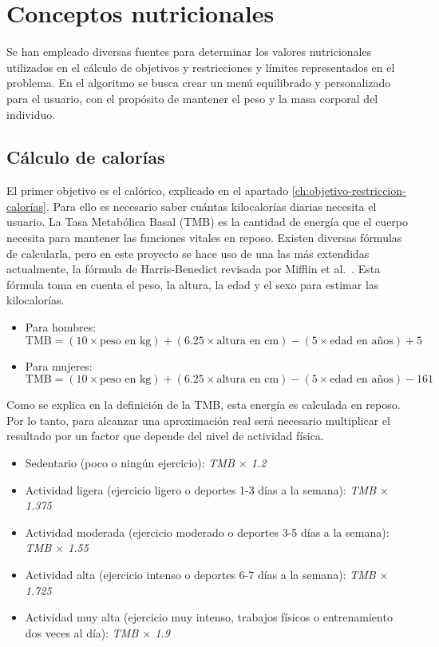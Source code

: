 \section{Conceptos nutricionales}

Se han empleado diversas fuentes para determinar los valores nutricionales utilizados en el cálculo de objetivos y restricciones y límites representados en el problema. En el algoritmo se busca crear un menú equilibrado y personalizado para el usuario, con el propósito de mantener el peso y la masa corporal del individuo.

\subsection{Cálculo de calorías}
\label{ch:calculo-calorías}

El primer objetivo es el calórico, explicado en el apartado \ref{ch:objetivo-restriccion-calorías}. Para ello es necesario saber cuántas kilocalorías diarias necesita el usuario. La Tasa Metabólica Basal (TMB) es la cantidad de energía que el cuerpo necesita para mantener las funciones vitales en reposo. Existen diversas fórmulas de calcularla, pero en este proyecto se hace uso de una las más extendidas actualmente, la fórmula de Harris-Benedict revisada por Mifflin et al.~\cite{mifflin1990}. Esta fórmula toma en cuenta el peso, la altura, la edad y el sexo para estimar las kilocalorías.
\begin{itemize}
    \item Para hombres:
    \[\text{TMB} = (10 \times \text{peso en kg}) + (6.25 \times \text{altura en cm}) - (5 \times \text{edad en años}) + 5\]
    \item Para mujeres:
    \[\text{TMB} = (10 \times \text{peso en kg}) + (6.25 \times \text{altura en cm}) - (5 \times \text{edad en años}) - 161\]
\end{itemize}
Como se explica en la definición de la TMB, esta energía es calculada en reposo. Por lo tanto, para alcanzar una aproximación real será necesario multiplicar el resultado por un factor que depende del nivel de actividad física.~\cite{krause2016}

\begin{itemize}
    \item Sedentario (poco o ningún ejercicio): \textit{TMB $\times$ 1.2}
    \item Actividad ligera (ejercicio ligero o deportes 1-3 días a la semana): \textit{TMB $\times$ 1.375}
    \item Actividad moderada (ejercicio moderado o deportes 3-5 días a la semana): \textit{TMB $\times$ 1.55}
    \item Actividad alta (ejercicio intenso o deportes 6-7 días a la semana): \textit{TMB $\times$ 1.725}
    \item Actividad muy alta (ejercicio muy intenso, trabajos físicos o entrenamiento dos veces al día): \textit{TMB $\times$ 1.9}
\end{itemize}

